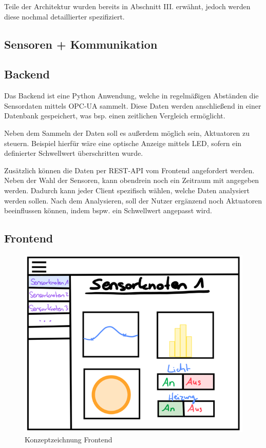 \documentclass[letterpaper, 10 pt, conference]{ieeeconf}  %
\begin{document}
Teile der Architektur wurden bereits in Abschnitt III. erwähnt, jedoch werden diese nochmal detaillierter spezifiziert.

\subsection{Sensoren + Kommunikation}


\subsection{Backend}

Das Backend ist eine Python Anwendung, welche in regelmäßigen Abständen die Sensordaten mittels OPC-UA sammelt.
Diese Daten werden anschließend in einer Datenbank gespeichert, was bsp. einen zeitlichen Vergleich ermöglicht.

Neben dem Sammeln der Daten soll es außerdem möglich sein, Aktuatoren zu steuern. 
Beispiel hierfür wäre eine optische Anzeige mittels LED, sofern ein definierter Schwellwert überschritten wurde.

Zusätzlich können die Daten per REST-API vom Frontend angefordert werden. 
Neben der Wahl der Sensoren, kann obendrein noch ein Zeitraum mit angegeben werden. 
Dadurch kann jeder Client spezifisch wählen, welche Daten analysiert werden sollen.
Nach dem Analysieren, soll der Nutzer ergänzend noch Aktuatoren beeinflussen können, indem bspw. ein Schwellwert angepasst wird. 

\subsection{Frontend}

\begin{figure}[thpb]
      \centering
      \includegraphics[scale=0.55]{abbildungen/frontend.png}
      \caption{Konzeptzeichnung Frontend}
      \label{fig:frontend}
 \end{figure}
 
\end{document}
